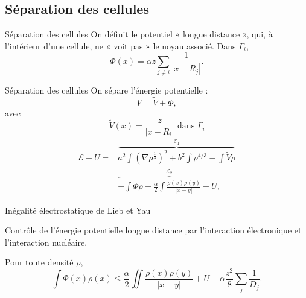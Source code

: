 \documentclass{beamer}
\renewcommand{\leq}{\leqslant}
\begin{document}
\subsection{Séparation des cellules}
\begin{frame}{Séparation des cellules}
    On définit le potentiel « longue distance », qui, à l'intérieur d'une cellule, ne « voit pas
    » le noyau associé. Dans $\Gamma_i$,
    \[\Phi(x) = \alpha z \sum_{j\neq i} \frac{1}{|x-R_j|}.\]
\end{frame}
\newcommand{\vv}{\widetilde{V}}
\newcommand{\vvv}{\widehat{V}}
\begin{frame}{Séparation des cellules}
    On sépare l'énergie potentielle :
    \[V = \vv + \Phi,\]
    avec
    \[\vv(x) = \frac z {|x - R_i|} \text{ dans $\Gamma_i$}\]
    \begin{align*}
    \mathcal{E} + U =&
    \overbrace{a^2\int (\nabla \rho^\frac{1}{3})^2 + b^2 \int \rho^{4/3}
    - \int \vv \rho}^{\mathcal{E}_1}\\
    &\overbrace{-\int \Phi \rho +  \frac{\alpha}{2}\int\frac{\rho(x) \rho(y)}{|x-y|}+U,}^{\mathcal{E}_2}
    \end{align*}
\end{frame}

\begin{frame}{Inégalité électrostatique de Lieb et Yau}

    Contrôle de l'énergie potentielle longue distance
    par l'interaction électronique et l'interaction nucléaire.

    \vspace{1cm}

    Pour toute densité $\rho$,
    \[\int\Phi(x)\rho(x) \leq \frac{\alpha}{2}\iint
    \frac{\rho(x)\rho(y)}{|x-y|} + U -
    \alpha \frac{z^2}{8}\sum_j \frac{1}{D_j}.\]
\end{frame}
\end{document}
